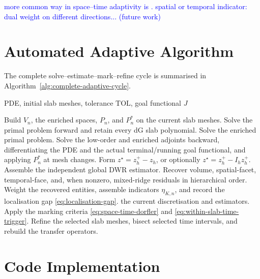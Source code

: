 \textcolor{blue}{more common way in space--time adaptivity is \cite{Bangerth_Rannacher_2003}. spatial or temporal indicator: dual weight on different directions... (future work)}



\section{Automated Adaptive Algorithm}

The complete solve--estimate--mark--refine cycle is summarised in Algorithm~\ref{alg:complete-adaptive-cycle}.

\begin{algorithm}[h]
\caption{Goal-oriented slabwise space--time adaptive cycle}
\label{alg:complete-adaptive-cycle}
\begin{algorithmic}[1]
\Require PDE, initial slab meshes, tolerance \(\mathrm{TOL}\), goal functional \(J\)

  \State Build \(V_n\), the enriched spaces, \(P_n\), and \(P_n^\ast\) on the current slab meshes.
  \State Solve the primal problem forward and retain every dG slab polynomial.
    \State Solve the enriched primal problem.
  \EndIf
  \State Solve the low-order and enriched adjoints backward, differentiating the PDE and the actual terminal/running goal functional, and applying \(P_n^\ast\) at mesh changes.
  \State Form \(z^\star=z_h^+-z_h\), or optionally \(z^\star=z_h^+-I_hz_h^+\).
  \State Assemble the independent global DWR estimator.
  \State Recover volume, spatial-facet, temporal-face, and, when nonzero, mixed-ridge residuals in hierarchical order.
  \State Weight the recovered entities, assemble indicators \(\eta_{K,n}\), and record the localisation gap \eqref{eq:localisation-gap}.
    \State \Return the current discretisation and estimators.
  \EndIf
  \State Apply the marking criteria \eqref{eq:space-time-dorfler} and \eqref{eq:within-slab-time-trigger}.
  \State Refine the selected slab meshes, bisect selected time intervals, and rebuild the transfer operators.
\EndWhile

\end{algorithmic}
\end{algorithm}


\section{Code Implementation}
\label{sec:single-indicator-loop}

